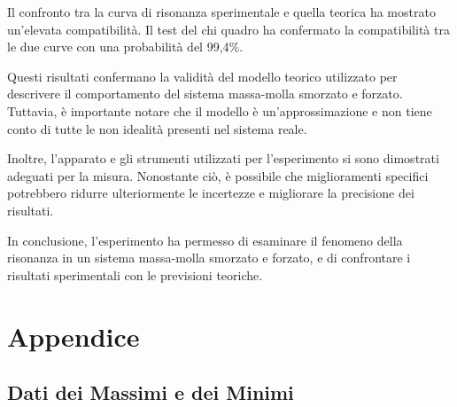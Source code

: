 \documentclass[12pt]{article}
\begin{document}
Il confronto tra la curva di risonanza sperimentale e quella teorica ha mostrato un'elevata compatibilità. Il test del chi quadro ha confermato la compatibilità tra le due curve con una probabilità del 99,4\%.

Questi risultati confermano la validità del modello teorico utilizzato per descrivere il comportamento del sistema massa-molla smorzato e forzato. Tuttavia, è importante notare che il modello è un'approssimazione e non tiene conto di tutte le non idealità presenti nel sistema reale.

Inoltre, l'apparato e gli strumenti utilizzati per l'esperimento si sono dimostrati adeguati per la misura. Nonostante ciò, è possibile che miglioramenti specifici potrebbero ridurre ulteriormente le incertezze e migliorare la precisione dei risultati.

In conclusione, l'esperimento ha permesso di esaminare il fenomeno della risonanza in un sistema massa-molla smorzato e forzato, e di confrontare i risultati sperimentali con le previsioni teoriche.

\newpage

\section{Appendice}

\subsection{Dati dei Massimi e dei Minimi}

\end{document}
